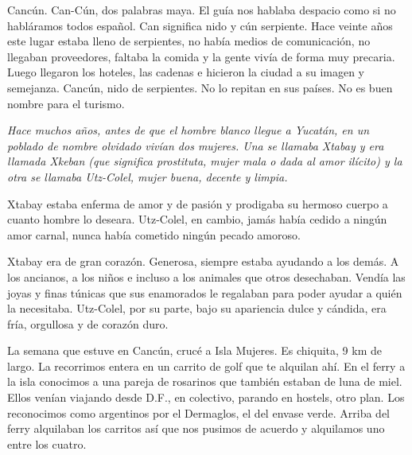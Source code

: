 \documentclass[12pt,twoside,openright,a5paper]{book}
\begin{document}
\vspace{0.5cm}
\hrulefill\hspace{0.2cm} \decofourleft\decofourright \hspace{0.2cm} \hrulefill
\vspace{0.5cm}

Cancún. Can-Cún, dos palabras maya. El guía nos
hablaba despacio como si no habláramos todos español. Can significa nido
y cún serpiente. Hace veinte años este lugar estaba lleno de serpientes,
no había medios de comunicación, no llegaban proveedores, faltaba la
comida y la gente vivía de forma muy precaria. Luego llegaron los hoteles,
las cadenas e hicieron la ciudad a su imagen y semejanza. Cancún, nido de
serpientes. No lo repitan en sus países. No es buen nombre para el turismo.


\vspace{0.5cm}
\hrulefill\hspace{0.2cm} \decofourleft\decofourright \hspace{0.2cm} \hrulefill
\vspace{0.5cm}

{\em Hace muchos años, antes de que el hombre blanco llegue a Yucatán,
en un poblado de nombre olvidado vivían dos mujeres. Una se llamaba Xtabay
y era llamada Xkeban (que significa prostituta, mujer mala o dada al amor
ilícito) y la otra se llamaba Utz-Colel, mujer buena, decente y limpia.

Xtabay estaba enferma de amor y de pasión y prodigaba su hermoso cuerpo
a cuanto hombre lo deseara. Utz-Colel, en cambio, jamás había cedido a
ningún amor carnal, nunca había cometido ningún pecado amoroso.

Xtabay era de gran corazón. Generosa, siempre estaba ayudando a los
demás. A los ancianos, a los niños e incluso a los animales que otros
desechaban. Vendía las joyas y finas túnicas que sus enamorados le regalaban
para poder ayudar a quién la necesitaba. Utz-Colel, por su parte, bajo su
apariencia dulce y cándida, era fría, orgullosa y de corazón duro.}

\afterpage{}
\vspace{0.5cm}
\hrulefill\hspace{0.2cm} \decofourleft\decofourright \hspace{0.2cm} \hrulefill
\vspace{0.5cm}

La semana que estuve en Cancún, crucé a Isla Mujeres. Es chiquita, 9 km de
largo. La recorrimos entera en un carrito de golf que te alquilan ahí. En
el ferry a la isla conocimos a una pareja de rosarinos que también estaban
de luna de miel. Ellos venían viajando desde D.F., en colectivo, parando
en hostels, otro plan. Los reconocimos como argentinos por el Dermaglos,
el del envase verde. Arriba del ferry alquilaban los carritos así que nos
pusimos de acuerdo y alquilamos uno entre los cuatro.
\end{document}
